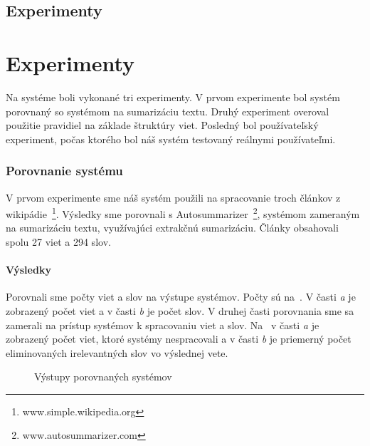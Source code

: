 \newpage
{}
{
	\section{Experimenty}
}
{
	\chapter{Experimenty}
}
\label{experiments}
Na systéme boli vykonané tri experimenty. V prvom experimente bol systém porovnaný so systémom na sumarizáciu textu. Druhý experiment overoval použitie pravidiel na základe štruktúry viet. Posledný bol používateľský experiment, počas ktorého bol náš systém testovaný reálnymi používateľmi.

\subsection{Porovnanie systému}
\label{experiments:first_experiment}
V prvom experimente sme náš systém použili na spracovanie troch článkov z wikipádie~\footnote{www.simple.wikipedia.org}. Výsledky sme porovnali s Autosummarizer~\footnote{www.autosummarizer.com}, systémom zameraným na sumarizáciu textu, využívajúci extrakčnú sumarizáciu. Články obsahovali spolu 27 viet a 294 slov.

\subsubsection{Výsledky}
\label{experiments:first_experiment:results}
Porovnali sme počty viet a slov na výstupe systémov. Počty sú na~. V časti \textit{a} je zobrazený počet viet a v časti \textit{b} je počet slov. V druhej časti porovnania sme sa zamerali na prístup systémov k spracovaniu viet a slov. Na~ v časti \textit{a} je zobrazený počet viet, ktoré systémy nespracovali a v časti \textit{b} je priemerný počet eliminovaných irelevantných slov vo výslednej vete. 

\begin{figure}[H]%
	\centering
	\qquad
	\caption{Výstupy porovnaných systémov}%
	\label{experiments:first_experiment:results:fig:output}%
\end{figure}

